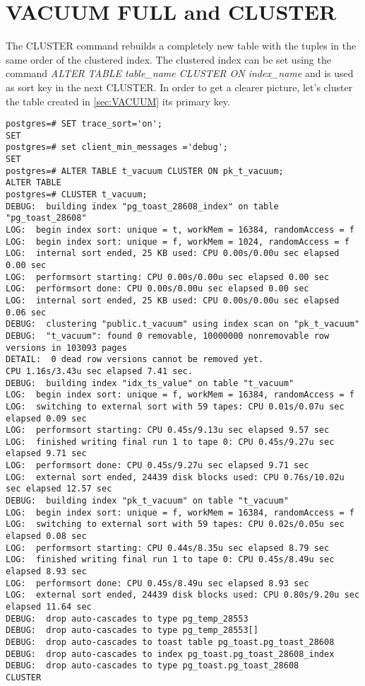 \section{VACUUM FULL and CLUSTER}
\label{sec:VACFULL}
The CLUSTER command rebuilds a completely new table with the tuples in the same order of the 
clustered index. The clustered index can be set using the command \textit{ALTER TABLE table\_name 
CLUSTER ON index\_name} and is used as sort key in the next CLUSTER. 
In order to get a clearer picture, let's cluster the table created in \ref{sec:VACUUM} its
primary key. 

\begin{lstlisting}[style=pgsql]
postgres=# SET trace_sort='on';
SET
postgres=# set client_min_messages ='debug';
SET
postgres=# ALTER TABLE t_vacuum CLUSTER ON pk_t_vacuum;
ALTER TABLE
postgres=# CLUSTER t_vacuum;
DEBUG:  building index "pg_toast_28608_index" on table "pg_toast_28608"
LOG:  begin index sort: unique = t, workMem = 16384, randomAccess = f
LOG:  begin index sort: unique = f, workMem = 1024, randomAccess = f
LOG:  internal sort ended, 25 KB used: CPU 0.00s/0.00u sec elapsed 0.00 sec
LOG:  performsort starting: CPU 0.00s/0.00u sec elapsed 0.00 sec
LOG:  performsort done: CPU 0.00s/0.00u sec elapsed 0.00 sec
LOG:  internal sort ended, 25 KB used: CPU 0.00s/0.00u sec elapsed 0.06 sec
DEBUG:  clustering "public.t_vacuum" using index scan on "pk_t_vacuum"
DEBUG:  "t_vacuum": found 0 removable, 10000000 nonremovable row versions in 103093 pages
DETAIL:  0 dead row versions cannot be removed yet.
CPU 1.16s/3.43u sec elapsed 7.41 sec.
DEBUG:  building index "idx_ts_value" on table "t_vacuum"
LOG:  begin index sort: unique = f, workMem = 16384, randomAccess = f
LOG:  switching to external sort with 59 tapes: CPU 0.01s/0.07u sec elapsed 0.09 sec
LOG:  performsort starting: CPU 0.45s/9.13u sec elapsed 9.57 sec
LOG:  finished writing final run 1 to tape 0: CPU 0.45s/9.27u sec elapsed 9.71 sec
LOG:  performsort done: CPU 0.45s/9.27u sec elapsed 9.71 sec
LOG:  external sort ended, 24439 disk blocks used: CPU 0.76s/10.02u sec elapsed 12.57 sec
DEBUG:  building index "pk_t_vacuum" on table "t_vacuum"
LOG:  begin index sort: unique = f, workMem = 16384, randomAccess = f
LOG:  switching to external sort with 59 tapes: CPU 0.02s/0.05u sec elapsed 0.08 sec
LOG:  performsort starting: CPU 0.44s/8.35u sec elapsed 8.79 sec
LOG:  finished writing final run 1 to tape 0: CPU 0.45s/8.49u sec elapsed 8.93 sec
LOG:  performsort done: CPU 0.45s/8.49u sec elapsed 8.93 sec
LOG:  external sort ended, 24439 disk blocks used: CPU 0.80s/9.20u sec elapsed 11.64 sec
DEBUG:  drop auto-cascades to type pg_temp_28553
DEBUG:  drop auto-cascades to type pg_temp_28553[]
DEBUG:  drop auto-cascades to toast table pg_toast.pg_toast_28608
DEBUG:  drop auto-cascades to index pg_toast.pg_toast_28608_index
DEBUG:  drop auto-cascades to type pg_toast.pg_toast_28608
CLUSTER

\end{lstlisting}

